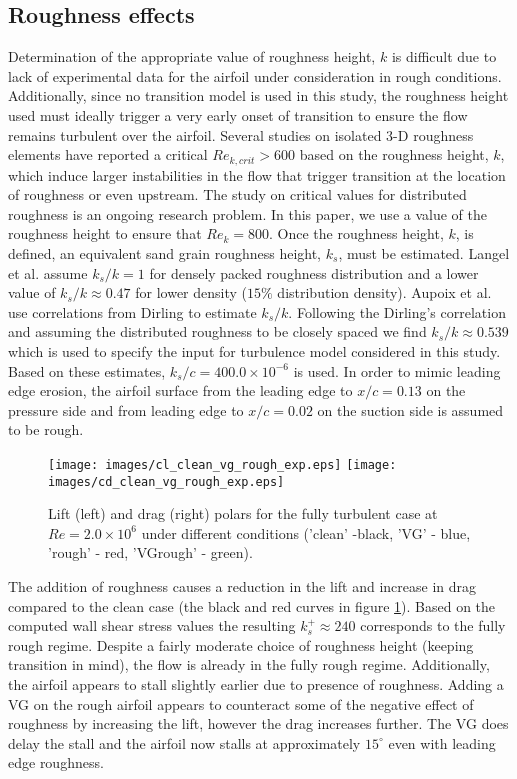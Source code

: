 \subsection{Roughness effects}
Determination of the appropriate value of roughness height, $k$ is difficult due to lack of experimental data for the airfoil under consideration in rough conditions. Additionally, since no transition model is used in this study, the roughness height used must ideally trigger a very early onset of transition to ensure the flow remains turbulent over the airfoil. Several studies on isolated 3-D roughness elements have reported a critical $Re_{k,crit} > 600$\cite{ref:langel2014}  based on the roughness height, $k$, which induce larger instabilities in the flow that trigger transition at the location of roughness or even upstream. The study on critical values for distributed roughness is an ongoing research problem\cite{ref:langel2014}. In this paper, we use a value of the roughness height to ensure that $Re_k=800$. Once the roughness height, $k$, is defined, an equivalent sand grain roughness height, $k_s$, must be estimated. Langel et al.\cite{ref:langel2015} assume $k_s/k = 1$ for densely packed roughness distribution and a lower value of $k_s/k \approx 0.47$ for lower density ($15\%$ distribution density). Aupoix et al.\cite{SAroughorig} use correlations from Dirling\cite{dirling1973method} to estimate $k_s/k$. Following the Dirling's correlation and assuming the distributed roughness to be closely spaced we find $k_s/k \approx 0.539$ which is used to specify the input for turbulence model considered in this study. Based on these estimates, $k_s/c = 400.0\times10^{-6}$ is used. In order to mimic leading edge erosion, the airfoil surface from the leading edge to $x/c=0.13$ on the pressure side and from leading edge to $x/c=0.02$ on the suction side is assumed to be rough.

\begin{figure}[h]
    \centering
    \texttt{[image: images/cl\_clean\_vg\_rough\_exp.eps]}
    \texttt{[image: images/cd\_clean\_vg\_rough\_exp.eps]} 
    \vspace*{-0.5cm}
    \caption{Lift (left) and drag (right) polars for the fully turbulent case at $Re=2.0\times10^6$ under different conditions ('clean' -black, 'VG' - blue, 'rough' - red, 'VGrough' - green).}
   \label{fig:vgroughpolar}
\end{figure}

The addition of roughness causes a reduction in the lift and increase in drag compared to the clean case (the black and red curves in figure \ref{fig:vgroughpolar}). Based on the computed wall shear stress values the resulting $k_s^+\approx 240$ corresponds to the fully rough regime. Despite a fairly moderate choice of roughness height (keeping transition in mind), the flow is already in the fully rough regime. Additionally, the airfoil appears to stall slightly earlier due to presence of roughness. Adding a VG on the rough airfoil appears to counteract some of the negative effect of roughness by increasing the lift, however the drag increases further. The VG does delay the stall and the airfoil now stalls at approximately $15^{\circ}$ even with leading edge roughness. 

